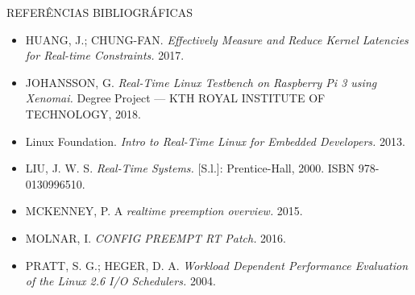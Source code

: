 \documentclass[12pt,brazil]{beamer}
\begin{document}
\begin{frame}{REFERÊNCIAS BIBLIOGRÁFICAS}

\begin{itemize}
    \item HUANG, J.; CHUNG-FAN. \textit{Effectively Measure and Reduce Kernel Latencies for Real-time Constraints.} 2017.
    \item JOHANSSON, G. \textit{Real-Time Linux Testbench on Raspberry Pi 3 using Xenomai.} Degree Project — KTH ROYAL INSTITUTE OF TECHNOLOGY, 2018.
    \item Linux Foundation. \textit{Intro to Real-Time Linux for Embedded Developers.} 2013.
    \item LIU, J. W. S. \textit{Real-Time Systems.} [S.l.]: Prentice-Hall, 2000. ISBN 978-0130996510.
    \item MCKENNEY, P. A \textit{realtime preemption overview.} 2015.
    \item MOLNAR, I. \textit{CONFIG PREEMPT RT Patch.} 2016. 
    \item PRATT, S. G.; HEGER, D. A. \textit{Workload Dependent Performance Evaluation of the Linux 2.6 I/O Schedulers.} 2004.
\end{itemize}
    
\end{frame}
\end{document}

